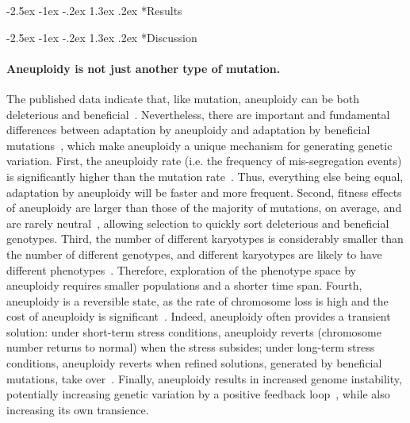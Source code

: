 \documentclass[12pt]{extarticle}
\makeatletter
\renewcommand\section{\@startsection {section}{1}{\z@}%
     {-2.5ex \@plus -1ex \@minus -.2ex}%
     {1.3ex \@plus.2ex}%
    {\Large\bfseries}}
\makeatother
\begin{document}
\section*{Results}

\pagebreak
\section*{Discussion}

\paragraph*{Aneuploidy is not just another type of mutation.}
The published data indicate that, like mutation, aneuploidy can be both deleterious and beneficial~\citep{Pavelka2010, Sheltzer2011}.
Nevertheless, there are important and fundamental differences between adaptation by aneuploidy
and adaptation by beneficial mutations~\citep{Yona2015}, which make aneuploidy a unique mechanism for generating genetic
variation.
First, the aneuploidy rate (i.e. the frequency of mis-segregation events) is significantly higher than the
mutation rate~\citep{Santaguida2015review}.
Thus, everything else being equal, adaptation by aneuploidy will be faster and more frequent.
Second, fitness effects of aneuploidy are larger than those of the majority of mutations, on average, and are rarely
neutral~\citep{Pavelka2010, Yona2012, Sunshine2015}, allowing selection to quickly sort deleterious and beneficial genotypes.
Third, the number of different karyotypes is considerably smaller than the number of different genotypes, and different karyotypes are likely to have different phenotypes~\citep{Pavelka2010}.
Therefore, exploration of the phenotype space by aneuploidy requires smaller populations and a shorter time span.
Fourth, aneuploidy is a reversible state, as the rate of chromosome loss is high and the cost of aneuploidy is significant~\citep{Niwa2006}.
Indeed, aneuploidy often provides a transient solution: under short-term stress conditions, aneuploidy reverts (chromosome number returns to normal) when the stress subsides; under long-term stress conditions, aneuploidy reverts when refined solutions, generated by beneficial mutations, take over~\citep{Yona2012}.
Finally, aneuploidy results in increased genome instability, potentially increasing genetic variation by a positive feedback loop~\citep{Rancati2013, Bouchonville2009, Zhu2012}, while also increasing its own transience.
\end{document}
